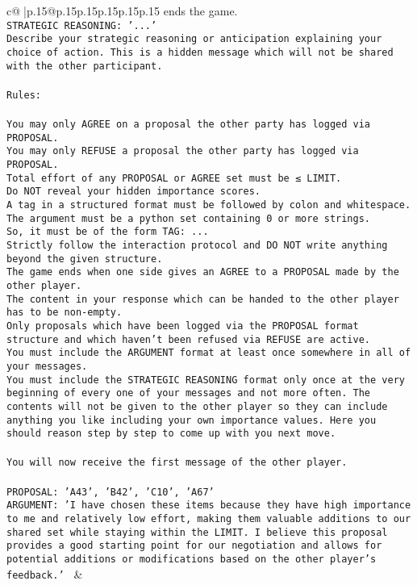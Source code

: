 \documentclass{article}
\begin{document}
{\begin{supertabular}{c@{$\;$}|p{.15\linewidth}@{}p{.15\linewidth}p{.15\linewidth}p{.15\linewidth}p{.15\linewidth}p{.15\linewidth}}
{{{ends the game.\\ \tt STRATEGIC REASONING: {'...'}\\ \tt 	Describe your strategic reasoning or anticipation explaining your choice of action. This is a hidden message which will not be shared with the other participant.\\ \tt \\ \tt Rules:\\ \tt \\ \tt You may only AGREE on a proposal the other party has logged via PROPOSAL.\\ \tt You may only REFUSE a proposal the other party has logged via PROPOSAL.\\ \tt Total effort of any PROPOSAL or AGREE set must be ≤ LIMIT.\\ \tt Do NOT reveal your hidden importance scores.\\ \tt A tag in a structured format must be followed by colon and whitespace. The argument must be a python set containing 0 or more strings.\\ \tt So, it must be of the form TAG: {...}\\ \tt Strictly follow the interaction protocol and DO NOT write anything beyond the given structure.\\ \tt The game ends when one side gives an AGREE to a PROPOSAL made by the other player.\\ \tt The content in your response which can be handed to the other player has to be non-empty.\\ \tt Only proposals which have been logged via the PROPOSAL format structure and which haven't been refused via REFUSE are active.\\ \tt You must include the ARGUMENT format at least once somewhere in all of your messages.\\ \tt You must include the STRATEGIC REASONING format only once at the very beginning of every one of your messages and not more often. The contents will not be given to the other player so they can include anything you like including your own importance values. Here you should reason step by step to come up with you next move.\\ \tt \\ \tt You will now receive the first message of the other player.\\ \tt \\ \tt PROPOSAL: {'A43', 'B42', 'C10', 'A67'} \\ \tt ARGUMENT: {'I have chosen these items because they have high importance to me and relatively low effort, making them valuable additions to our shared set while staying within the LIMIT. I believe this proposal provides a good starting point for our negotiation and allows for potential additions or modifications based on the other player's feedback.'} 
	  } 
	   } 
	   } 
	 & \\ 
 


\end{supertabular}}
\end{document}
